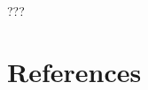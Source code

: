 \documentclass[12pt,twoside]{report}
\begin{document}
???




%
%

\section{References}


\end{document}
